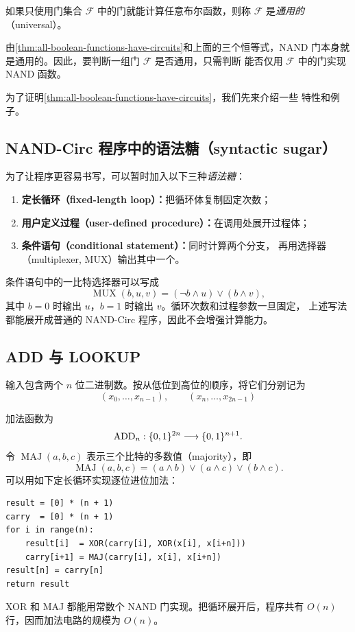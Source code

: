 \begin{definition}[通用门组]
  \label{def:universal-gate-set}
  如果只使用门集合 $\mathcal F$ 中的门就能计算任意布尔函数，则称
  $\mathcal F$ 是\emph{通用的}（universal）。
\end{definition}

由\cref{thm:all-boolean-functions-have-circuits}和上面的三个恒等式，NAND
门本身就是通用的。因此，要判断一组门 $\mathcal F$ 是否通用，只需判断
能否仅用 $\mathcal F$ 中的门实现 NAND 函数。

为了证明\cref{thm:all-boolean-functions-have-circuits}，我们先来介绍一些
特性和例子。

\subsection{NAND-Circ 程序中的语法糖（syntactic sugar）}

为了让程序更容易书写，可以暂时加入以下三种\emph{语法糖}：

\begin{enumerate}[label=\arabic*.]
  \item \textbf{定长循环（fixed-length loop）：}把循环体复制固定次数；
  \item \textbf{用户定义过程（user-defined procedure）：}在调用处展开过程体；
  \item \textbf{条件语句（conditional statement）：}同时计算两个分支，
    再用选择器（multiplexer, MUX）输出其中一个。
\end{enumerate}

条件语句中的一比特选择器可以写成
\[
  \operatorname{MUX}(b,u,v)
  =(\neg b\land u)\lor(b\land v),
\]
其中 $b=0$ 时输出 $u$，$b=1$ 时输出 $v$。循环次数和过程参数一旦固定，
上述写法都能展开成普通的 NAND-Circ 程序，因此不会增强计算能力。

\subsection{ADD 与 LOOKUP}

\begin{example}[ADD]
  \label{ex:add-circuit}
  输入包含两个 $n$ 位二进制数。按从低位到高位的顺序，将它们分别记为
  \[
    (x_0,\ldots,x_{n-1}),
    \qquad
    (x_n,\ldots,x_{2n-1})
  \]
  \par\noindent
  加法函数为
  \[
    \operatorname{ADD}_n:\{0,1\}^{2n}\longrightarrow\{0,1\}^{n+1}.
  \]
  令 $\operatorname{MAJ}(a,b,c)$ 表示三个比特的多数值（majority），即
  \[
    \operatorname{MAJ}(a,b,c)
    =(a\land b)\lor(a\land c)\lor(b\land c).
  \]
  可以用如下定长循环实现逐位进位加法：
\begin{verbatim}
result = [0] * (n + 1)
carry  = [0] * (n + 1)
for i in range(n):
    result[i]  = XOR(carry[i], XOR(x[i], x[i+n]))
    carry[i+1] = MAJ(carry[i], x[i], x[i+n])
result[n] = carry[n]
return result
\end{verbatim}
  XOR 和 MAJ 都能用常数个 NAND 门实现。把循环展开后，程序共有 $O(n)$
  行，因而加法电路的规模为 $O(n)$。
\end{example}

